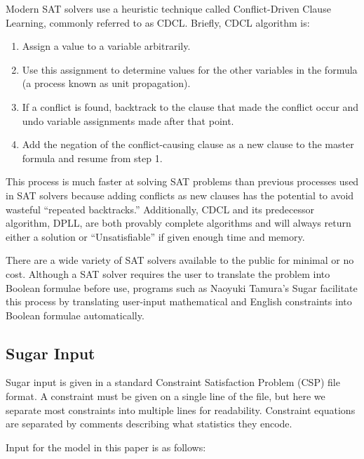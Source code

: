 \documentclass[runningheads]{llncs}
\begin{document}
Modern SAT solvers use a heuristic technique called Conflict-Driven
Clause Learning, commonly referred to as CDCL\cite{cdcl}. Briefly, CDCL algorithm
is:

\begin{enumerate}

\item Assign a value to a variable arbitrarily.
\item Use this assignment to determine values for the other variables
  in the formula (a process known as unit propagation).
\item If a conflict is found, backtrack to the clause that made the
  conflict occur and undo variable assignments made after that point.
\item Add the negation of the conflict-causing clause as a new clause
  to the master formula and resume from step 1.

\end{enumerate}

This process is much faster at solving SAT problems than previous
processes used in SAT solvers because adding conflicts as new clauses
has the potential to avoid wasteful ``repeated backtracks.''
Additionally, CDCL and its predecessor algorithm, DPLL, are both
provably complete algorithms and will always return either a solution
or ``Unsatisfiable'' if given enough time and memory.

There are a wide variety of SAT solvers available to the public for
minimal or no cost. Although a SAT solver requires the user to
translate the problem into Boolean formulae before use, programs such
as Naoyuki Tamura's Sugar facilitate this process by translating
user-input mathematical and English constraints into Boolean formulae
automatically.

\subsection{Sugar Input}

Sugar input is given in a standard Constraint Satisfaction Problem
(CSP) file format. A constraint must be given on a single line of the
file, but here we separate most constraints into multiple lines for
readability. Constraint equations are separated by comments describing
what statistics they encode.

Input for the model in this paper is as follows:


\fi
\end{document}
